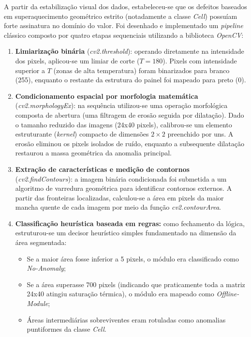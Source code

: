 \documentclass[a4paper,11pt]{article}
\begin{document}
A partir da estabilização visual dos dados, estabeleceu-se que os defeitos baseados em superaquecimento geométrico estrito (notadamente a classe \textit{Cell}) possuíam forte assinatura no domínio do valor. Foi desenhado e implementado um \textit{pipeline} clássico composto por quatro etapas sequenciais utilizando a biblioteca \textit{OpenCV}:

\begin{enumerate}
	\item \textbf{Limiarização binária} (\textit{cv2.threshold}): operando diretamente na intensidade dos pixels, aplicou-se um limiar de corte ($T = 180$). Pixels com intensidade superior a $T$ (zonas de alta temperatura) foram binarizados para branco (255), enquanto o restante da estrutura do painel foi mapeado para preto (0).
	\item \textbf{Condicionamento espacial por morfologia matemática} (\textit{cv2.morphologyEx}): na sequência utilizou-se uma operação morfológica composta de abertura (uma filtragem de erosão seguida por dilatação). Dado o tamanho reduzido das imagens (24x40 pixels), calibrou-se um elemento estruturante (\textit{kernel}) compacto de dimensões $2\times2$ preenchido por uns. A erosão eliminou os pixels isolados de ruído, enquanto a subsequente dilatação restaurou a massa geométrica da anomalia principal.
	\item \textbf{Extração de características e medição de contornos} (\textit{cv2.findContours}): a imagem binária condicionada foi submetida a um algoritmo de varredura geométrica para identificar contornos externos. A partir das fronteiras localizadas, calculou-se a área em pixels da maior mancha quente de cada imagem por meio da função \textit{cv2.contourArea}.
	\item \textbf{Classificação heurística baseada em regras:} como fechamento da lógica, estruturou-se um decisor heurístico simples fundamentado na dimensão da área segmentada:
	      \begin{itemize}
		      \item Se a maior área fosse inferior a 5 pixels, o módulo era classificado como \textit{No-Anomaly};
		      \item Se a área superasse 700 pixels (indicando que praticamente toda a matriz 24x40 atingiu saturação térmica), o módulo era mapeado como \textit{Offline-Module};
		      \item Áreas intermediárias sobreviventes eram rotuladas como anomalias puntiformes da classe \textit{Cell}.
	      \end{itemize}
\end{enumerate}
\end{document}
